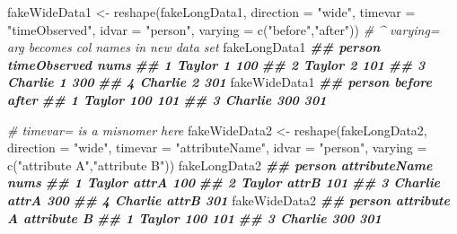 \documentclass[
  12pt,
  krantz2]{krantz}
\makeatletter
\newenvironment{Shaded}{\begin{snugshade}}{\end{snugshade}}
\newcommand{\AttributeTok}[1]{\textcolor[rgb]{0.61,0.61,0.61}{#1}}
\newcommand{\CommentTok}[1]{\textcolor[rgb]{0.37,0.37,0.37}{\textit{#1}}}
\newcommand{\DocumentationTok}[1]{\textcolor[rgb]{0.37,0.37,0.37}{\textbf{\textit{#1}}}}
\newcommand{\FunctionTok}[1]{\textcolor[rgb]{0,0,0}{#1}}
\newcommand{\NormalTok}[1]{#1}
\newcommand{\OtherTok}[1]{\textcolor[rgb]{0.37,0.37,0.37}{#1}}
\newcommand{\StringTok}[1]{\textcolor[rgb]{0.5,0.5,0.5}{#1}}
\newenvironment{kframe}{%
\medskip{}
\setlength{\fboxsep}{.8em}
 \def\at@end@of@kframe{}%
 \ifinner\ifhmode%
  \def\at@end@of@kframe{\end{minipage}}%
  \begin{minipage}{\columnwidth}%
 \fi\fi%
 \def\FrameCommand##1{\hskip\@totalleftmargin \hskip-\fboxsep
 \colorbox{shadecolor}{##1}\hskip-\fboxsep
     \hskip-\linewidth \hskip-\@totalleftmargin \hskip\columnwidth}%
 \MakeFramed {\advance\hsize-\width
   \@totalleftmargin\z@ \linewidth\hsize
   \@setminipage}}%
 {\par\unskip\endMakeFramed%
 \at@end@of@kframe}
\renewenvironment{Shaded}{\begin{kframe}}{\end{kframe}}
\makeatother
\begin{document}
\begin{Shaded}
\begin{Highlighting}[]
\NormalTok{fakeWideData1 }\OtherTok{\textless{}{-}} \FunctionTok{reshape}\NormalTok{(fakeLongData1, }
                           \AttributeTok{direction =} \StringTok{"wide"}\NormalTok{, }
                           \AttributeTok{timevar =} \StringTok{"timeObserved"}\NormalTok{, }
                           \AttributeTok{idvar =} \StringTok{"person"}\NormalTok{, }
                           \AttributeTok{varying =} \FunctionTok{c}\NormalTok{(}\StringTok{"before"}\NormalTok{,}\StringTok{"after"}\NormalTok{)) }
\CommentTok{\# \^{} varying= arg becomes col names in new data set}
\NormalTok{fakeLongData1}
\DocumentationTok{\#\#    person timeObserved nums}
\DocumentationTok{\#\# 1  Taylor            1  100}
\DocumentationTok{\#\# 2  Taylor            2  101}
\DocumentationTok{\#\# 3 Charlie            1  300}
\DocumentationTok{\#\# 4 Charlie            2  301}
\NormalTok{fakeWideData1}
\DocumentationTok{\#\#    person before after}
\DocumentationTok{\#\# 1  Taylor    100   101}
\DocumentationTok{\#\# 3 Charlie    300   301}
\end{Highlighting}
\end{Shaded}

\begin{Shaded}
\begin{Highlighting}[]
\CommentTok{\# timevar= is a misnomer here}
\NormalTok{fakeWideData2 }\OtherTok{\textless{}{-}} \FunctionTok{reshape}\NormalTok{(fakeLongData2, }
                           \AttributeTok{direction =} \StringTok{"wide"}\NormalTok{, }
                           \AttributeTok{timevar =} \StringTok{"attributeName"}\NormalTok{, }
                           \AttributeTok{idvar =} \StringTok{"person"}\NormalTok{, }
                           \AttributeTok{varying =} \FunctionTok{c}\NormalTok{(}\StringTok{"attribute A"}\NormalTok{,}\StringTok{"attribute B"}\NormalTok{)) }
\NormalTok{fakeLongData2}
\DocumentationTok{\#\#    person attributeName nums}
\DocumentationTok{\#\# 1  Taylor         attrA  100}
\DocumentationTok{\#\# 2  Taylor         attrB  101}
\DocumentationTok{\#\# 3 Charlie         attrA  300}
\DocumentationTok{\#\# 4 Charlie         attrB  301}
\NormalTok{fakeWideData2}
\DocumentationTok{\#\#    person attribute A attribute B}
\DocumentationTok{\#\# 1  Taylor         100         101}
\DocumentationTok{\#\# 3 Charlie         300         301}
\end{Highlighting}
\end{Shaded}
\end{document}
